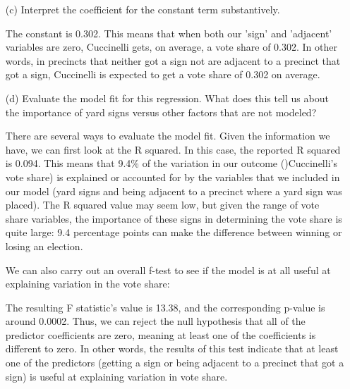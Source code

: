 \documentclass[12pt,letterpaper]{article}
\begin{document}
\begin{enumerate}
	\vspace{0.5cm}
	\item [(c)] Interpret the coefficient for the constant term substantively.
	\vspace{0.5cm}
	
	The constant is 0.302. This means that when both our 'sign' and 'adjacent' variables are zero, Cuccinelli gets, on average, a vote share of 0.302. In other words, in precincts that neither got a sign not are adjacent to a precinct that got a sign, Cuccinelli is expected to get a vote share of 0.302 on average. 
	
	\vspace{0.5cm}
	\item [(d)] Evaluate the model fit for this regression.  What does this	tell us about the importance of yard signs versus other factors that are not modeled?
	\vspace{0.5cm}
	
	There are several ways to evaluate the model fit. Given the information we have, we can first look at the R squared. In this case, the reported R squared is 0.094. This means that 9.4\% of the variation in our outcome ()Cuccinelli's vote share) is explained or accounted for by the variables that we included in our model (yard signs and being adjacent to a precinct where a yard sign was placed). The R squared value may seem low, but given the range of vote share variables, the importance of these signs in determining the vote share is quite large: 9.4 percentage points can make the difference between winning or losing an election. 
	
	\newpage
	
	We can also carry out an overall f-test to see if the model is at all useful at explaining variation in the vote share: 
		
	 
	
	The resulting F statistic's value is 13.38, and the corresponding p-value is around 0.0002. Thus, we can reject the null hypothesis that all of the predictor coefficients
	are zero, meaning at least one of the coefficients is different to zero. In other words, the results of this test indicate that at least one of the predictors (getting a sign or being adjacent to a precinct that got a sign) is useful at explaining variation in vote share. 
	
\end{enumerate}  
\end{document}

